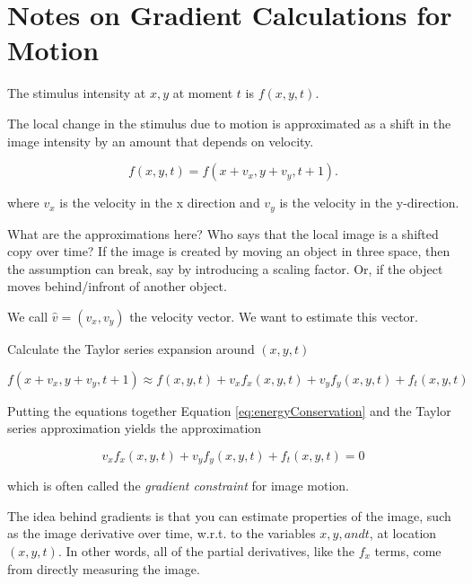 


\section{Notes on Gradient Calculations for Motion}

The stimulus intensity at $x,y$ at moment $t$ is $f(x,y,t)$.

The local change in the stimulus due to motion is approximated as
a shift in the image intensity by an amount that depends on velocity.

\begin{equation}
\label{eq:energyConservation}
f(x,y,t) = f(x + v_x, y + v_y, t + 1 ).
\end{equation}

where $v_x$ is the velocity in the x direction and
$v_y$ is the velocity in the y-direction.

What are the approximations here?  Who says that the local
image is a shifted copy over time?  If the image is created
by moving an object in three space, then the assumption can
break, say by introducing a scaling factor.  Or, if the
object moves behind/infront of another object.

We call $\hat{v} = (v_x,v_y)$ the velocity vector.
We want to estimate this vector.

Calculate the Taylor series expansion around $(x,y,t)$

\begin{equation}
f(x+v_x,y+v_y,t+1) \approx f(x,y,t) 
    + v_x f_x(x,y,t) + v_y f_y(x,y,t) + f_t(x,y,t)
\end{equation}

Putting the equations together Equation \ref{eq:energyConservation}
and the Taylor series approximation yields the approximation

\begin{equation}
\label{eq:gradientConstraint}
v_x f_x(x,y,t) + v_y f_y(x,y,t) + f_t(x,y,t) = 0
\end{equation}

which is often called the {\em gradient constraint} for
image motion.  

The idea behind gradients is that you can
estimate properties of the image,
such as the image derivative over time, w.r.t. to the variables 
$x, y, and t$,
at location $(x,y,t)$.  
In other words, all of the partial
derivatives, like the $f_x$ terms,
come from directly measuring the image.

